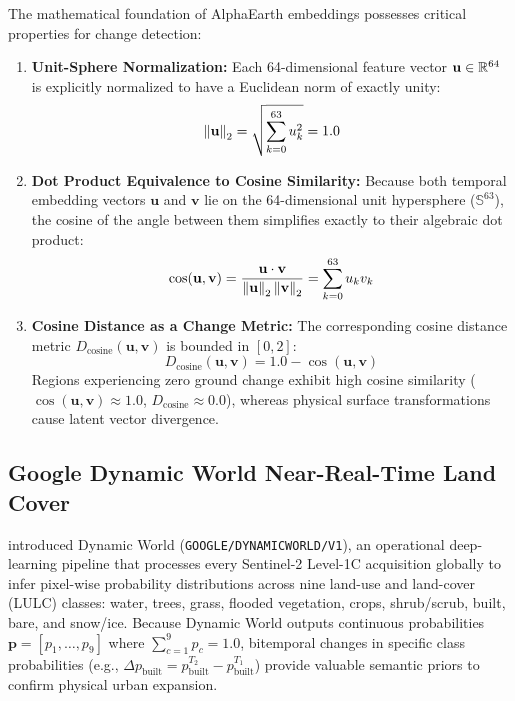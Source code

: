The mathematical foundation of AlphaEarth embeddings possesses critical properties for change detection:
\begin{enumerate}
    \item \textbf{Unit-Sphere Normalization:} Each 64-dimensional feature vector $\mathbf{u} \in \mathbb{R}^{64}$ is explicitly normalized to have a Euclidean norm of exactly unity:
    \begin{equation}
        \left\lVert\mathbf{u}\right\rVert_2 = \sqrt{\sum_{k=0}^{63} u_k^2} = 1.0
        \label{eq:unit_norm}
    \end{equation}
    \item \textbf{Dot Product Equivalence to Cosine Similarity:} Because both temporal embedding vectors $\mathbf{u}$ and $\mathbf{v}$ lie on the 64-dimensional unit hypersphere ($\mathbb{S}^{63}$), the cosine of the angle between them simplifies exactly to their algebraic dot product:
    \begin{equation}
        \cos(\mathbf{u}, \mathbf{v}) = \frac{\mathbf{u} \cdot \mathbf{v}}{\left\lVert\mathbf{u}\right\rVert_2 \left\lVert\mathbf{v}\right\rVert_2} = \sum_{k=0}^{63} u_k v_k
        \label{eq:cosine_dot}
    \end{equation}
    \item \textbf{Cosine Distance as a Change Metric:} The corresponding cosine distance metric $D_{\text{cosine}}(\mathbf{u}, \mathbf{v})$ is bounded in $[0, 2]$:
    \begin{equation}
        D_{\text{cosine}}(\mathbf{u}, \mathbf{v}) = 1.0 - \cos(\mathbf{u}, \mathbf{v})
        \label{eq:cosine_dist_def}
    \end{equation}
    Regions experiencing zero ground change exhibit high cosine similarity ($\cos(\mathbf{u}, \mathbf{v}) \approx 1.0$, $D_{\text{cosine}} \approx 0.0$), whereas physical surface transformations cause latent vector divergence.
\end{enumerate}

\subsection{Google Dynamic World Near-Real-Time Land Cover}
\citet{brown2022dynamicworld} introduced Dynamic World (\texttt{GOOGLE/DYNAMICWORLD/V1}), an operational deep-learning pipeline that processes every Sentinel-2 Level-1C acquisition globally to infer pixel-wise probability distributions across nine land-use and land-cover (LULC) classes: water, trees, grass, flooded vegetation, crops, shrub/scrub, built, bare, and snow/ice. Because Dynamic World outputs continuous probabilities $\mathbf{p} = [p_1, \dots, p_9]$ where $\sum_{c=1}^9 p_c = 1.0$, bitemporal changes in specific class probabilities (e.g., $\Delta p_{\text{built}} = p_{\text{built}}^{T_2} - p_{\text{built}}^{T_1}$) provide valuable semantic priors to confirm physical urban expansion.

